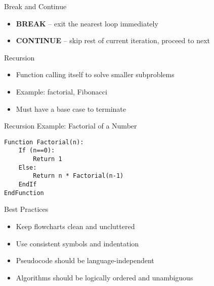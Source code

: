 \documentclass[12pt, aspectratio=169]{beamer}
\begin{document}
    \begin{frame}{Break and Continue}
        \begin{itemize}
            \item \textbf{BREAK} – exit the nearest loop immediately
            \item \textbf{CONTINUE} – skip rest of current iteration, proceed to next
        \end{itemize}
    \end{frame}


    \begin{frame}{Recursion}
        \begin{itemize}
            \item Function calling itself to solve smaller subproblems
            \item Example: factorial, Fibonacci
            \item Must have a base case to terminate
        \end{itemize}
    \end{frame}


    \begin{frame}[fragile]{Recursion Example: Factorial of a Number}
        \begin{verbatim}
Function Factorial(n):
    If (n==0):
        Return 1
    Else:
        Return n * Factorial(n-1)
    EndIf
EndFunction
        \end{verbatim}
    \end{frame}


    

    \begin{frame}{Best Practices}
    \begin{itemize}
        \item Keep flowcharts clean and uncluttered
        \item Use consistent symbols and indentation
        \item Pseudocode should be language-independent
        \item Algorithms should be logically ordered and unambiguous
    \end{itemize}
    \end{frame}
    
\end{document}
